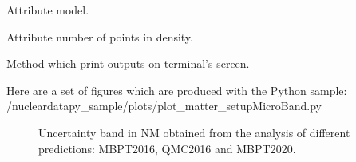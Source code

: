 \documentclass[letterpaper,10pt,english]{sphinxmanual}
\begin{document}
\begin{fulllineitems}
\begin{fulllineitems}
\end{fulllineitems}


\begin{fulllineitems}
\label{\detokenize{source/api/setup_matter_micro_band:nucleardatapy.matter.setup_micro_band.setupMicroBand.models}}
\pysigstartsignatures
{}
\pysigstopsignatures
\sphinxAtStartPar
Attribute model.

\end{fulllineitems}


\begin{fulllineitems}
\label{\detokenize{source/api/setup_matter_micro_band:nucleardatapy.matter.setup_micro_band.setupMicroBand.nden}}
\pysigstartsignatures
{}
\pysigstopsignatures
\sphinxAtStartPar
Attribute number of points in density.

\end{fulllineitems}


\begin{fulllineitems}
\label{\detokenize{source/api/setup_matter_micro_band:nucleardatapy.matter.setup_micro_band.setupMicroBand.print_outputs}}
\pysigstartsignatures
{}
\pysigstopsignatures
\sphinxAtStartPar
Method which print outputs on terminal’s screen.

\end{fulllineitems}


\end{fulllineitems}


\sphinxAtStartPar
Here are a set of figures which are produced with the Python sample: /nucleardatapy\_sample/plots/plot\_matter\_setupMicroBand.py

\begin{figure}[htbp]
\centering
\capstart

\noindent{}
\caption{Uncertainty band in NM obtained from the analysis of different predictions: MBPT\sphinxhyphen{}2016, QMC\sphinxhyphen{}2016 and MBPT\sphinxhyphen{}2020.}\label{\detokenize{source/api/setup_matter_micro_band:id1}}\end{figure}
\end{document}
